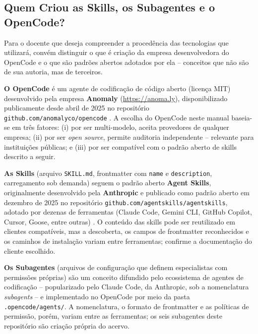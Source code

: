 \subsection{Quem Criou as Skills, os Subagentes e o OpenCode?}

Para o docente que deseja compreender a proced{\^e}ncia das tecnologias que utilizar{\'a}, conv{\'e}m distinguir o que {\'e} cria{\c c}{\~a}o da empresa desenvolvedora do OpenCode e o que s{\~a}o padr{\~o}es abertos adotados por ela -- conceitos que n{\~a}o s{\~a}o de sua autoria, mas de terceiros.

\textbf{O OpenCode} {\'e} um agente de codifica{\c c}{\~a}o de c{\'o}digo aberto (licen{\c c}a MIT) desenvolvido pela empresa \textbf{Anomaly} (\url{https://anoma.ly}), disponibilizado publicamente desde abril de 2025 no reposit{\'o}rio \texttt{github.com/anomalyco/opencode} \cite{opencode2026doc}. A escolha do OpenCode neste manual baseia-se em tr{\^e}s fatores: (i) por ser multi-modelo, aceita provedores de qualquer empresa; (ii) por ser \emph{open source}, permite auditoria independente -- relevante para institui{\c c}{\~o}es p{\'u}blicas; e (iii) por ser compat{\'i}vel com o padr{\~a}o aberto de skills descrito a seguir.

\textbf{As Skills} (arquivo \texttt{SKILL.md}, frontmatter com \texttt{name} e \texttt{description}, carregamento sob demanda) seguem o padr{\~a}o aberto \textbf{Agent Skills}, originalmente desenvolvido pela \textbf{Anthropic} e publicado como padr{\~a}o aberto em dezembro de 2025 no reposit{\'o}rio \texttt{github.com/agentskills/agentskills}, adotado por dezenas de ferramentas (Claude Code, Gemini CLI, GitHub Copilot, Cursor, Goose, entre outras) \cite{anthropic2025skills}. O conte{\'u}do das skills pode ser reutilizado em clientes compat{\'i}veis, mas a descoberta, os campos de frontmatter reconhecidos e os caminhos de instala{\c c}{\~a}o variam entre ferramentas; confirme a documenta{\c c}{\~a}o do cliente escolhido.

\textbf{Os Subagentes} (arquivos de configura{\c c}{\~a}o que definem especialistas com permiss{\~o}es pr{\'o}prias) s{\~a}o um conceito difundido pelo ecossistema de agentes de codifica{\c c}{\~a}o -- popularizado pelo Claude Code, da Anthropic, sob a nomenclatura \emph{subagents} \cite{opencode2026agents} -- e implementado no OpenCode por meio da pasta \texttt{.opencode/agents/}. A nomenclatura, o formato de frontmatter e as pol{\'i}ticas de permiss{\~a}o, por{\'e}m, variam entre as ferramentas; os seis subagentes deste reposit{\'o}rio s{\~a}o cria{\c c}{\~a}o pr{\'o}pria do acervo.

